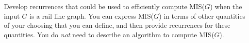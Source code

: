 \documentclass[11pt]{article}
\def\question#1{\red{#1}}
\def\red#1{{\color{red}#1}}
\begin{document}
\question{Develop recurrences that could be used to efficiently compute MIS($G$) when the input $G$ is a rail line graph.} You
can express MIS($G$) in terms of other quantities of your
choosing that you can define, and then provide recurrences for these quantities.
You do \emph{not} need to describe an algorithm to compute MIS($G$).
\end{document}
